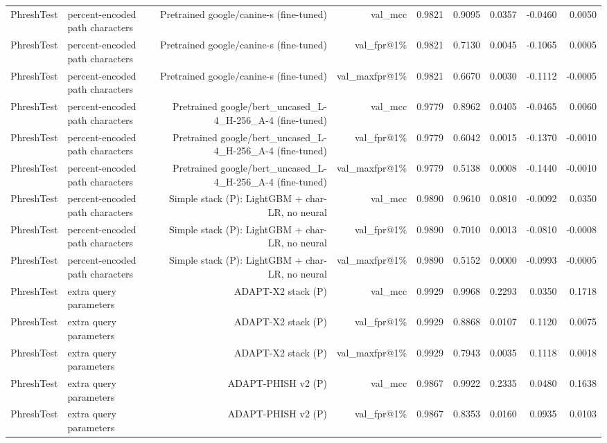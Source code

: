 \begin{table}[t]
\begin{tabular}{llrrrrrrr}
PhreshTest & percent-encoded path characters & Pretrained google/canine-s (fine-tuned) & val\_mcc & 0.9821 & 0.9095 & 0.0357 & -0.0460 & 0.0050 \\
PhreshTest & percent-encoded path characters & Pretrained google/canine-s (fine-tuned) & val\_fpr@1\% & 0.9821 & 0.7130 & 0.0045 & -0.1065 & 0.0005 \\
PhreshTest & percent-encoded path characters & Pretrained google/canine-s (fine-tuned) & val\_maxfpr@1\% & 0.9821 & 0.6670 & 0.0030 & -0.1112 & -0.0005 \\
PhreshTest & percent-encoded path characters & Pretrained google/bert\_uncased\_L-4\_H-256\_A-4 (fine-tuned) & val\_mcc & 0.9779 & 0.8962 & 0.0405 & -0.0465 & 0.0060 \\
PhreshTest & percent-encoded path characters & Pretrained google/bert\_uncased\_L-4\_H-256\_A-4 (fine-tuned) & val\_fpr@1\% & 0.9779 & 0.6042 & 0.0015 & -0.1370 & -0.0010 \\
PhreshTest & percent-encoded path characters & Pretrained google/bert\_uncased\_L-4\_H-256\_A-4 (fine-tuned) & val\_maxfpr@1\% & 0.9779 & 0.5138 & 0.0008 & -0.1440 & -0.0010 \\
PhreshTest & percent-encoded path characters & Simple stack (P): LightGBM + char-LR, no neural & val\_mcc & 0.9890 & 0.9610 & 0.0810 & -0.0092 & 0.0350 \\
PhreshTest & percent-encoded path characters & Simple stack (P): LightGBM + char-LR, no neural & val\_fpr@1\% & 0.9890 & 0.7010 & 0.0013 & -0.0810 & -0.0008 \\
PhreshTest & percent-encoded path characters & Simple stack (P): LightGBM + char-LR, no neural & val\_maxfpr@1\% & 0.9890 & 0.5152 & 0.0000 & -0.0993 & -0.0005 \\
PhreshTest & extra query parameters & ADAPT-X2 stack (P) & val\_mcc & 0.9929 & 0.9968 & 0.2293 & 0.0350 & 0.1718 \\
PhreshTest & extra query parameters & ADAPT-X2 stack (P) & val\_fpr@1\% & 0.9929 & 0.8868 & 0.0107 & 0.1120 & 0.0075 \\
PhreshTest & extra query parameters & ADAPT-X2 stack (P) & val\_maxfpr@1\% & 0.9929 & 0.7943 & 0.0035 & 0.1118 & 0.0018 \\
PhreshTest & extra query parameters & ADAPT-PHISH v2 (P) & val\_mcc & 0.9867 & 0.9922 & 0.2335 & 0.0480 & 0.1638 \\
PhreshTest & extra query parameters & ADAPT-PHISH v2 (P) & val\_fpr@1\% & 0.9867 & 0.8353 & 0.0160 & 0.0935 & 0.0103 \\

\end{tabular}
\end{table}
